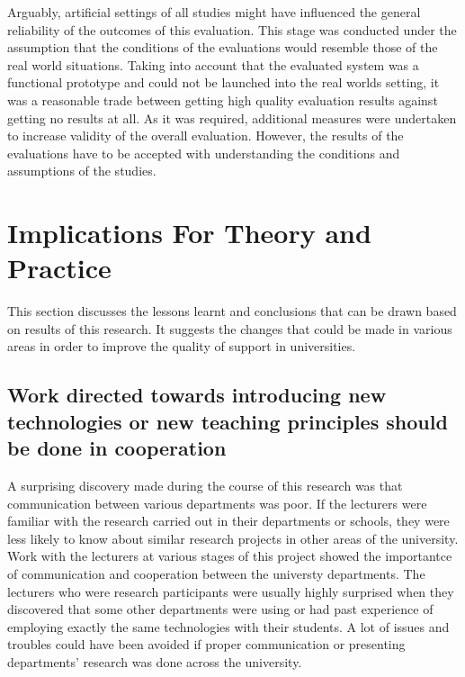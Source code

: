 Arguably, artificial settings of all studies might have influenced the general
reliability of the outcomes of this evaluation. This stage was conducted
under the assumption that the conditions of the evaluations would resemble those
of the real world situations. Taking into account that the evaluated system was
a functional prototype and could not be launched into the real worlds setting,
it was a reasonable trade between getting high quality evaluation results
against getting no results at all. As it was required, additional measures were
undertaken to increase validity of the overall evaluation. However, the results
of the evaluations have to be accepted with understanding the conditions and
assumptions of the studies.

\section{Implications For Theory and Practice}

This section discusses the lessons learnt and conclusions that can be drawn
based on results of this research. It suggests the changes that could be made in
various areas in order to improve the quality of \LLLs support in universities.

\subsection[Cooperation and Communication]{Work directed towards introducing
new technologies or new teaching principles should be done in cooperation}

A surprising discovery made during the course of this research was that
communication between various departments was poor. If the lecturers were
familiar with the research carried out in their departments or schools, they
were less likely to know about similar research projects in other areas of
the university. Work with the lecturers at various stages of this project showed
the importantce of communication and cooperation between the universty
departments. The lecturers who were research participants were usually highly
surprised when they discovered that some other departments were using or had
past experience of employing exactly the same technologies with their students.
A lot of issues and troubles could have been avoided if proper communication or
presenting departments' research was done across the university.

